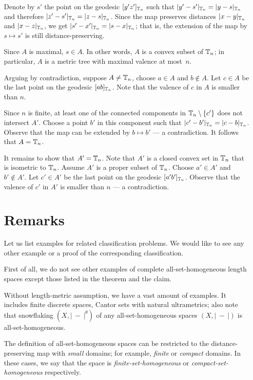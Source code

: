 \documentclass[a4paper,10pt]{article}
\begin{document}
Denote by $s'$ the point on the geodesic $[y'z']_{\mathbb{T}_n}$ such that $|y'-s'|_{\TT_n}\z=|y-s|_{\TT_n}$ and therefore $|z'-s'|_{\mathbb{T}_n}=|z-s|_{\mathbb{T}_n}$.
Since the map preserves distances $|x-y|_{\mathbb{T}_n}$ and $|x-z|_{\mathbb{T}_n}$, we get $|s'-x'|_{\mathbb{T}_n}=|s-x|_{\mathbb{T}_n}$;
that is, the extension of the map by $s\mapsto s'$ is still distance-preserving.

Since $A$ is maximal, $s\in A$.
In other words, $A$ is a convex subset of $\mathbb{T}_n$;
in particular, $A$ is a metric tree with maximal valence at most~$n$.

Arguing by contradiction, suppose $A\ne \mathbb{T}_n$, choose $a\in A$ and $b\notin A$. 
Let $c\in A$ be the last point on the geodesic $[ab]_{\mathbb{T}_n}$.
Note that the valence of $c$ in $A$ is smaller than $n$.

Since $n$ is finite, at least one of the connected components in $\TT_n\z\setminus \{c'\}$ does not intersect $A'$.
Choose a point $b'$ in this component such that $|c'-b'|_{\mathbb{T}_n}=|c-b|_{\mathbb{T}_n}$.
Observe that the map can be extended by $b\mapsto b'$ --- a contradiction.
It follows that $A=\mathbb{T}_n$.

It remains to show that $A'=\mathbb{T}_n$.
Note that $A'$ is a closed convex set in $\mathbb{T}_n$ that is isometric to $\mathbb{T}_n$.
Assume $A'$ is a proper subset of $\mathbb{T}_n$.
Choose $a'\in A'$ and $b'\notin A'$.
Let $c'\in A'$ be the last point on the geodesic $[a'b']_{\mathbb{T}_n}$.
Observe that the valence of $c'$ in $A'$ is smaller than $n$ --- a contradiction.
\qeds

\section{Remarks}


Let us list examples for related classification problems.
We would like to see any other example or a proof of the corresponding classification. 

First of all, we do not see other examples of complete all-set-homogeneous length spaces except those listed in the theorem and the claim.

Without length-metric assumption, we have a vast amount of examples.
It includes finite discrete spaces, Cantor sets with natural ultrametrics;
also note that snowflaking $(X,|\ -\ |^\theta)$ of any all-set-homogeneous spaces $(X,|\ -\ |)$ is all-set-homogeneous.

The definition of all-set-homogeneous spaces can be restricted to the distance-preserving map with \emph{small} domains; for example, \emph{finite} or \emph{compact} domains.
In these cases, we say that the space is \emph{finite-set-homogeneous} or \emph{compact-set-homogeneous} respectively.
\end{document}
